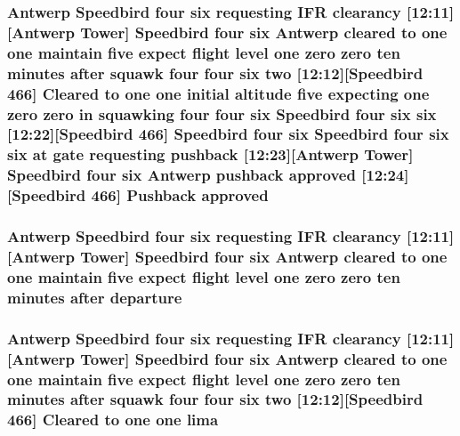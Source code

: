 \subsubsection[{\texorpdfstring{approved}{approved}}]{\setlength{\rightskip}{0pt plus 5cm}Antwerp Speedbird four {\bf six} requesting I\+FR clearancy \mbox{[}12\+:11\mbox{]}\mbox{[}Antwerp {\bf Tower}\mbox{]} Speedbird four {\bf six} Antwerp cleared to {\bf one} {\bf one} maintain five expect flight level {\bf one} {\bf zero} {\bf zero} {\bf ten} minutes after squawk four four {\bf six} {\bf two} \mbox{[}12\+:12\mbox{]}\mbox{[}Speedbird 466\mbox{]} Cleared to {\bf one} {\bf one} initial altitude five expecting {\bf one} {\bf zero} {\bf zero} in {\bf squawking} four four {\bf six} Speedbird four {\bf six} {\bf six} \mbox{[}12\+:22\mbox{]}\mbox{[}Speedbird 466\mbox{]} Speedbird four {\bf six} Speedbird four {\bf six} {\bf six} at gate requesting pushback \mbox{[}12\+:23\mbox{]}\mbox{[}Antwerp {\bf Tower}\mbox{]} Speedbird four {\bf six} Antwerp pushback approved \mbox{[}12\+:24\mbox{]}\mbox{[}Speedbird 466\mbox{]} Pushback approved}\hypertarget{ATC_8txt_acbd3c2686d25cb28a0ea453e1ebfef6c}{}\label{ATC_8txt_acbd3c2686d25cb28a0ea453e1ebfef6c}
\subsubsection[{\texorpdfstring{departure}{departure}}]{\setlength{\rightskip}{0pt plus 5cm}Antwerp Speedbird four {\bf six} requesting I\+FR clearancy \mbox{[}12\+:11\mbox{]}\mbox{[}Antwerp {\bf Tower}\mbox{]} Speedbird four {\bf six} Antwerp cleared to {\bf one} {\bf one} maintain five expect flight level {\bf one} {\bf zero} {\bf zero} {\bf ten} minutes after departure}\hypertarget{ATC_8txt_af9835824e50bb6ca59bed75129f137e3}{}\label{ATC_8txt_af9835824e50bb6ca59bed75129f137e3}
\subsubsection[{\texorpdfstring{lima}{lima}}]{\setlength{\rightskip}{0pt plus 5cm}Antwerp Speedbird four {\bf six} requesting I\+FR clearancy \mbox{[}12\+:11\mbox{]}\mbox{[}Antwerp {\bf Tower}\mbox{]} Speedbird four {\bf six} Antwerp cleared to {\bf one} {\bf one} maintain five expect flight level {\bf one} {\bf zero} {\bf zero} {\bf ten} minutes after squawk four four {\bf six} {\bf two} \mbox{[}12\+:12\mbox{]}\mbox{[}Speedbird 466\mbox{]} Cleared to {\bf one} {\bf one} lima}\hypertarget{ATC_8txt_a4f581ea086ea8bcc78589348ca970791}{}\label{ATC_8txt_a4f581ea086ea8bcc78589348ca970791}
